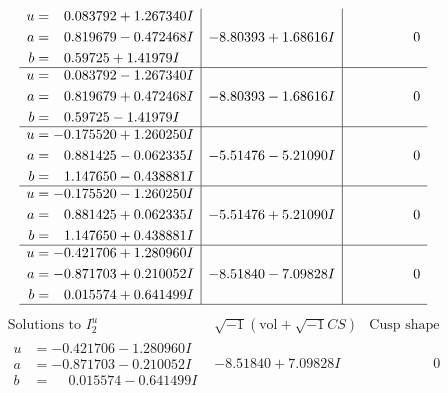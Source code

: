 \documentclass[1p]{elsarticle_modified}
\theoremstyle{definition}
\newcommand{\I}{\sqrt{-1}}
\begin{document}
$$\begin{array}{c|c|c}
\begin{aligned}
u &= \phantom{-}0.083792 + 1.267340 I \\
a &= \phantom{-}0.819679 - 0.472468 I \\
b &= \phantom{-}0.59725 + 1.41979 I\end{aligned}
 & -8.80393 + 1.68616 I & \phantom{-0.000000 } 0 \\ \hline\begin{aligned}
u &= \phantom{-}0.083792 - 1.267340 I \\
a &= \phantom{-}0.819679 + 0.472468 I \\
b &= \phantom{-}0.59725 - 1.41979 I\end{aligned}
 & -8.80393 - 1.68616 I & \phantom{-0.000000 } 0 \\ \hline\begin{aligned}
u &= -0.175520 + 1.260250 I \\
a &= \phantom{-}0.881425 - 0.062335 I \\
b &= \phantom{-}1.147650 - 0.438881 I\end{aligned}
 & -5.51476 - 5.21090 I & \phantom{-0.000000 } 0 \\ \hline\begin{aligned}
u &= -0.175520 - 1.260250 I \\
a &= \phantom{-}0.881425 + 0.062335 I \\
b &= \phantom{-}1.147650 + 0.438881 I\end{aligned}
 & -5.51476 + 5.21090 I & \phantom{-0.000000 } 0 \\ \hline\begin{aligned}
u &= -0.421706 + 1.280960 I \\
a &= -0.871703 + 0.210052 I \\
b &= \phantom{-}0.015574 + 0.641499 I\end{aligned}
 & -8.51840 - 7.09828 I & \phantom{-0.000000 } 0\\
 \hline 
 \end{array}$$\newpage$$\begin{array}{c|c|c}  
\text{Solutions to }I^u_{2}& \I (\text{vol} + \sqrt{-1}CS) & \text{Cusp shape}\\
 \hline 
\begin{aligned}
u &= -0.421706 - 1.280960 I \\
a &= -0.871703 - 0.210052 I \\
b &= \phantom{-}0.015574 - 0.641499 I\end{aligned}
 & -8.51840 + 7.09828 I & \phantom{-0.000000 } 0 \\ \hline\begin{aligned}

\end{aligned}
\end{array}$$
\end{document}
